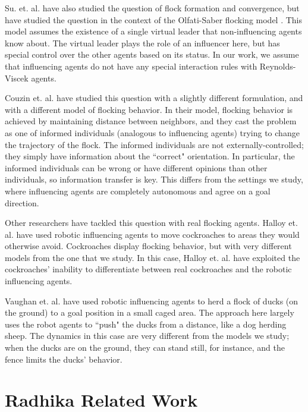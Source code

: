 Su. et. al. \cite{su2009virtualleaderinformed} have also studied the question
of flock formation and convergence, but have studied the question in the
context of the Olfati-Saber flocking model
\cite{olfati2006virtualleaderinformed}.
This model assumes the existence of a single virtual leader that
non-influencing agents know about.
The virtual leader plays the role of an influencer here, but has special
control over the other agents based on its status.
In our work, we assume that influencing agents do not have any special
interaction rules with Reynolds-Viscek agents.

Couzin et. al. \cite{couzin2005} have studied this question with a slightly
different formulation, and with a different model of flocking behavior.
In their model, flocking behavior is achieved by maintaining distance between
neighbors, and they cast the problem as one of informed individuals (analogous
to influencing agents) trying to change the trajectory of the flock.
The informed individuals are not externally-controlled; they simply have
information about the ``correct" orientation.
In particular, the informed individuals can be wrong or have different opinions
than other individuals, so information transfer is key.
This differs from the settings we study, where influencing agents are
completely autonomous and agree on a goal direction.

Other researchers have tackled this question with real flocking agents.
Halloy et. al. \cite{Halloy2007} have used robotic influencing agents to move
cockroaches to areas they would otherwise avoid.
Cockroaches display flocking behavior, but with very different models from the
one that we study.
In this case, Halloy et. al. have exploited the cockroaches' inability to
differentiate between real cockroaches and the robotic influencing agents.

Vaughan et. al. \cite{vaughan98} have used robotic influencing agents to herd
a flock of ducks (on the ground) to a goal position in a small caged area.
The approach here largely uses the robot agents to ``push" the ducks from a
distance, like a dog herding sheep.
The dynamics in this case are very different from the models we study; when the
ducks are on the ground, they can stand still, for instance, and the fence
limits the ducks' behavior.

\section{Radhika Related Work}
